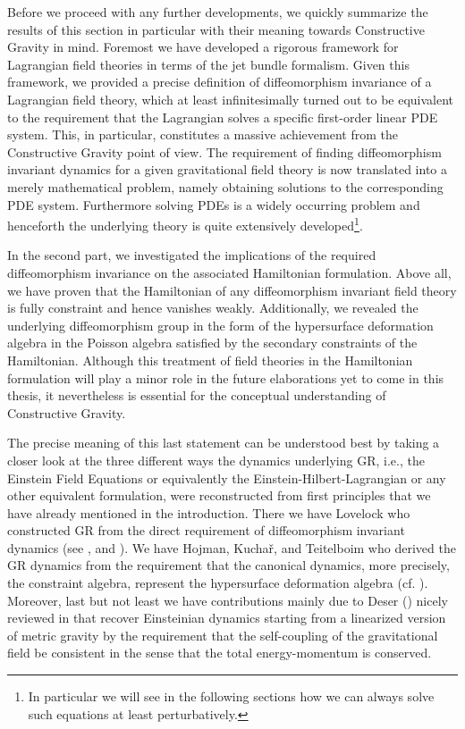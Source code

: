 Before we proceed with any further developments, we quickly summarize the results of this section in particular with their meaning towards Constructive Gravity in mind. 
Foremost we have developed a rigorous framework for Lagrangian field theories in terms of the jet bundle formalism.  Given this framework, we provided a precise definition of diffeomorphism invariance of a Lagrangian field theory, which at least infinitesimally turned out to be equivalent to the requirement that the Lagrangian solves a specific first-order linear PDE system.  This, in particular, constitutes a massive achievement from the Constructive Gravity point of view. The requirement of finding diffeomorphism invariant dynamics for a given gravitational field theory is now translated into a merely mathematical problem, namely obtaining solutions to the corresponding PDE system. Furthermore solving PDEs is a widely occurring problem and henceforth the underlying theory is quite extensively developed\footnote{In particular we will see in the following sections how we can always solve such equations at least perturbatively.}.

In the second part, we investigated the implications of the required diffeomorphism invariance on the associated Hamiltonian formulation. Above all, we have proven that the Hamiltonian of any diffeomorphism invariant field theory is fully constraint and hence vanishes weakly. Additionally, we revealed the underlying diffeomorphism group in the form of the hypersurface deformation algebra in the Poisson algebra satisfied by the secondary constraints of the Hamiltonian. Although this treatment of field theories in the Hamiltonian formulation will play a minor role in the future elaborations yet to come in this thesis, it nevertheless is essential for the conceptual understanding of Constructive Gravity. 

The precise meaning of this last statement can be understood best by taking a closer look at the three different ways the dynamics underlying GR, i.e., the Einstein Field Equations or equivalently the Einstein-Hilbert-Lagrangian or any other equivalent formulation, were reconstructed from first principles that we have already mentioned in the introduction. There we have Lovelock who constructed GR from the direct requirement of diffeomorphism invariant dynamics (see \cite{Lovelock1969}, \cite{doi:10.1063/1.1665613} and \cite{doi:10.1063/1.1666069}). 
We have Hojman, Kuchař, and Teitelboim who derived the GR dynamics from the requirement that the canonical dynamics, more precisely, the constraint algebra, represent the hypersurface deformation algebra (cf. \cite{HOJMAN197688}). Moreover, last but not least we have contributions mainly due to Deser (\cite{1970GReGr...1....9D}) nicely reviewed in \cite{2008IJMPD..17..367P} that recover Einsteinian dynamics starting from a linearized version of metric gravity by the requirement that the self-coupling of the gravitational field be consistent in the sense that the total energy-momentum is conserved.

